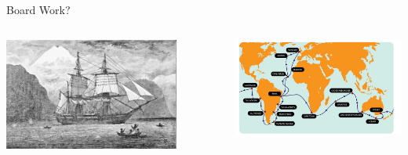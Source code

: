 \documentclass[10pt]{beamer}
\begin{document}
\begin{frame}
	\begin{center}
		\textcolor{myblue}{\LARGE{Board Work?}}
	\end{center}	
\end{frame}  


\begin{frame}
	\begin{columns}
		\begin{column}{0.5\textwidth}
			\begin{center}
				\includegraphics[width=0.8\textwidth]{figures/beagle.png}
			\end{center}
		\end{column}
		
		\begin{column}{0.5\textwidth}
			\begin{center}
				\includegraphics[width=1.0\textwidth]{figures/voyage.jpg}
			\end{center}
		\end{column}
	\end{columns}
\end{frame}  
\end{document}
